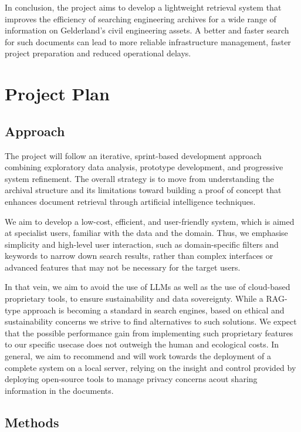 In conclusion, the project aims to develop a lightweight retrieval system that improves the efficiency of searching engineering archives for a wide range of information on Gelderland's civil engineering assets.  
A better and faster search for such documents can lead to more reliable infrastructure management, faster project preparation and reduced operational delays.


\section{Project Plan}

\subsection{Approach}

The project will follow an iterative, sprint-based development approach combining exploratory data analysis, prototype development, and progressive system refinement. 
The overall strategy is to move from understanding the archival structure and its limitations toward building a proof of concept that enhances document retrieval through artificial intelligence techniques.

We aim to develop a low-cost, efficient, and user-friendly system, which is aimed at specialist users, familiar with the data and the domain.
Thus, we emphasise simplicity and high-level user interaction, such as domain-specific filters and keywords to narrow down search results, rather than complex interfaces or advanced features that may not be necessary for the target users.

In that vein, we aim to avoid the use of LLMs as well as the use of cloud-based proprietary tools, to ensure sustainability and data sovereignty.
While a RAG-type approach is becoming a standard in search engines, based on ethical and sustainability concerns we strive to find alternatives to such solutions.
We expect that the possible performance gain from implementing such proprietary features to our specific usecase does not outweigh the human and ecological costs. 
In general, we aim to recommend and will work towards the deployment of a complete system on a local server, relying on the insight and control provided by deploying open-source tools to manage privacy concerns acout sharing information in the documents.

\subsection{Methods}

